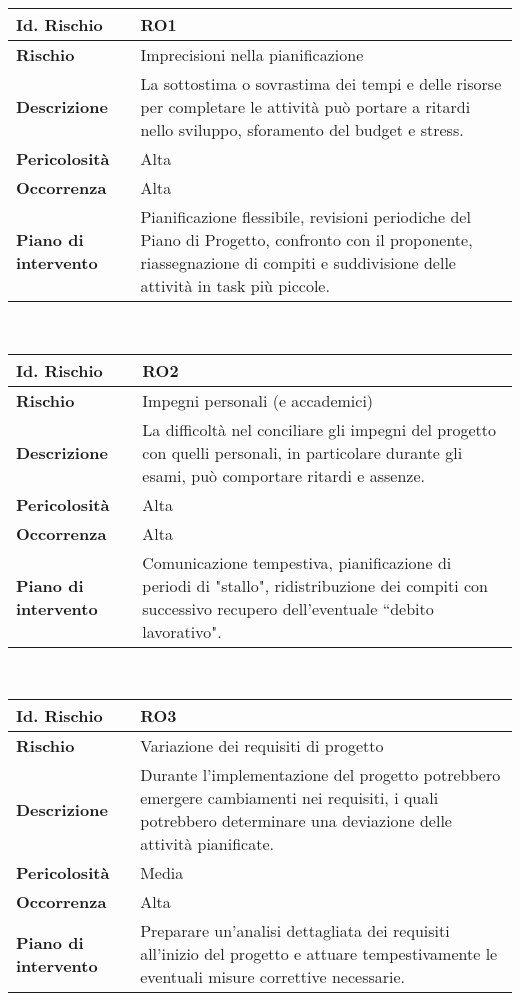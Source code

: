 \hypertarget{RO1}{}
\begin{tabular}{|L{4cm}|L{9.7cm}|}
    \hline
    \textbf{Id. Rischio} & \textbf{RO1} \\
    \hline
    \textbf{Rischio} & Imprecisioni nella pianificazione \\
    \hline
    \textbf{Descrizione} & La sottostima o sovrastima dei tempi e delle risorse per completare le attività può portare a ritardi nello sviluppo, sforamento del budget e stress. \\
    \hline
    \textbf{Pericolosità} & Alta \\
    \hline
    \textbf{Occorrenza} & Alta \\
    \hline
    \textbf{Piano di intervento} & Pianificazione flessibile, revisioni periodiche del Piano di Progetto, confronto con il proponente, riassegnazione di compiti e suddivisione delle attività in task più piccole. \\
    \hline
\end{tabular}
\\[30pt]
\hypertarget{RO2}{}
\begin{tabular}{|L{4cm}|L{9.7cm}|}
    \hline
    \textbf{Id. Rischio} & \textbf{RO2} \\
    \hline
    \textbf{Rischio} & Impegni personali (e accademici) \\
    \hline
    \textbf{Descrizione} & La difficoltà nel conciliare gli impegni del progetto con quelli personali, in particolare durante gli esami, può comportare ritardi e assenze. \\
    \hline
    \textbf{Pericolosità} & Alta \\
    \hline
    \textbf{Occorrenza} & Alta \\
    \hline
    \textbf{Piano di intervento} & Comunicazione tempestiva, pianificazione di periodi di "stallo", ridistribuzione dei compiti con successivo recupero dell'eventuale ``debito lavorativo". \\
    \hline
\end{tabular}
\\[30pt]
\hypertarget{RO3}{}
\begin{tabular}{|L{4cm}|L{9.7cm}|}
    \hline
    \textbf{Id. Rischio} & \textbf{RO3} \\
    \hline
    \textbf{Rischio} & Variazione dei requisiti di progetto \\
    \hline
    \textbf{Descrizione} & Durante l'implementazione del progetto potrebbero emergere cambiamenti nei requisiti, i quali potrebbero determinare una deviazione delle attività pianificate. \\
    \hline
    \textbf{Pericolosità} & Media \\
    \hline
    \textbf{Occorrenza} & Alta \\
    \hline
    \textbf{Piano di intervento} & Preparare un'analisi dettagliata dei requisiti all'inizio del progetto e attuare tempestivamente le eventuali misure correttive necessarie. \\
    \hline
\end{tabular}
